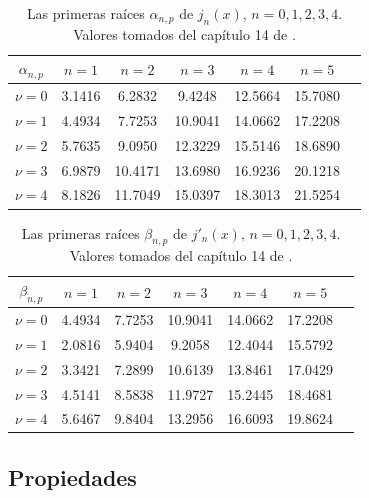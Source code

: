 \begin{table}[htbp]
    \centering
    \begin{tabular}{ccccccc}
    \hline $\alpha_{n,p}$ & $n=1$ & $n=2$ & $n=3$ & $n=4$ & $n=5$ \\ \hline 
    $\nu=0$ & 3.1416 &  6.2832 &  9.4248 & 12.5664 & 15.7080 \\
    $\nu=1$ & 4.4934 &  7.7253 & 10.9041 & 14.0662 & 17.2208 \\
    $\nu=2$ & 5.7635 &  9.0950 & 12.3229 & 15.5146 & 18.6890 \\
    $\nu=3$ & 6.9879 & 10.4171 & 13.6980 & 16.9236 & 20.1218 \\
    $\nu=4$ & 8.1826 & 11.7049 & 15.0397 & 18.3013 & 21.5254 \\
    \hline 
    \end{tabular} 
    \caption{Las primeras raíces $\alpha_{n,p}$ de $j_n(x)$, $n=0,1,2,3,4$. Valores tomados del capítulo 14 de \cite{Arfken}.}
    \label{tab:alphanun_esferica}
\end{table}

\begin{table}[htbp]
    \centering
    \begin{tabular}{ccccccc}
    \hline $\beta_{n,p}$ & $n=1$ & $n=2$ & $n=3$ & $n=4$ & $n=5$ \\ \hline 
    $\nu=0$ & 4.4934 & 7.7253 & 10.9041 & 14.0662 & 17.2208 \\
    $\nu=1$ & 2.0816 & 5.9404 &  9.2058 & 12.4044 & 15.5792 \\
    $\nu=2$ & 3.3421 & 7.2899 & 10.6139 & 13.8461 & 17.0429 \\
    $\nu=3$ & 4.5141 & 8.5838 & 11.9727 & 15.2445 & 18.4681 \\
    $\nu=4$ & 5.6467 & 9.8404 & 13.2956 & 16.6093 & 19.8624 \\
    \hline 
    \end{tabular} 
    \caption{Las primeras raíces $\beta_{n,p}$ de $j'_n(x)$, $n=0,1,2,3,4$. Valores tomados del capítulo 14 de \cite{Arfken}.}
    \label{tab:betanun_esferica}
\end{table}

\subsection{Propiedades}

